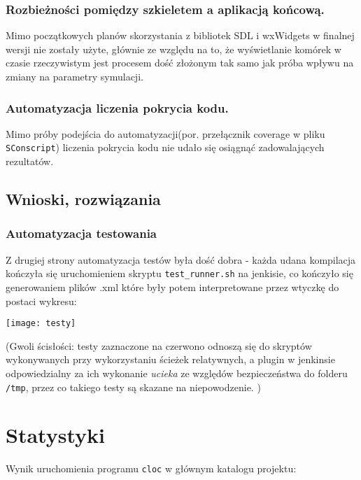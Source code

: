 \documentclass{article}
\begin{document}
	\subsubsection{Rozbieżności pomiędzy szkieletem a aplikacją końcową.}
	Mimo początkowych planów skorzystania z bibliotek SDL i wxWidgets w finalnej wersji nie zostały użyte, głównie ze względu na to, że wyświetlanie komórek w czasie rzeczywistym jest procesem dość złożonym tak samo jak próba wpływu na zmiany na parametry symulacji. 
	
	\subsubsection{Automatyzacja liczenia pokrycia kodu.}
	Mimo próby podejścia do automatyzacji(por. przełącznik coverage w pliku \texttt{SConscript}) liczenia pokrycia kodu nie udało się osiągnąć zadowalających rezultatów.
	
	\subsection{Wnioski, rozwiązania}
 	
 	\subsubsection{Automatyzacja testowania}
 	Z drugiej strony automatyzacja testów była dość dobra - każda udana kompilacja kończyła się uruchomieniem skryptu \texttt{test\_runner.sh} na jenkisie, co kończyło się generowaniem plików .xml które były potem interpretowane przez wtyczkę do postaci wykresu:
 	
 	
 	\texttt{[image: testy]} 
 	
 	(Gwoli ścisłości: testy zaznaczone na czerwono odnoszą się do skryptów wykonywanych przy wykorzystaniu ścieżek relatywnych, a plugin w jenkinsie odpowiedzialny za ich wykonanie \textit{ucieka} ze względów bezpieczeństwa do folderu \texttt{/tmp}, przez co takiego testy są skazane na niepowodzenie. )
 	
 	
\section{Statystyki}
Wynik uruchomienia programu \texttt{cloc} w głównym katalogu projektu:

\newpage
\end{document}
